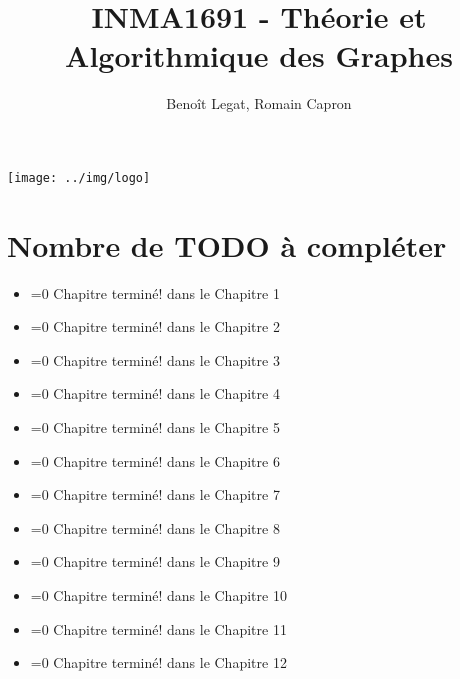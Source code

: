 

\title{INMA1691 - Théorie et Algorithmique des Graphes}
\author{Beno\^it Legat, Romain Capron}



\maketitle
\begin{center}
  \texttt{[image: ../img/logo]}
\end{center}
\newpage
\clearpage

\tableofcontents
\newpage


\newcommand{\addTODO}
{
  \textcolor{red}{TODO}\stepcounter{todo_\thesection}
}

\newcommand{\chapterdone}[2]
{
  \ifnum#1=0
    Chapitre terminé!
  \else
    #1 dans le Chapitre #2
  \fi
}














\clearpage
\section{Nombre de TODO à compléter \danger}
\begin{itemize}
  \item \chapterdone{}{1}
  \item \chapterdone{}{2}
  \item \chapterdone{}{3}
  \item \chapterdone{}{4}
  \item \chapterdone{}{5}
  \item \chapterdone{}{6}
  \item \chapterdone{}{7}
  \item \chapterdone{}{8}
  \item \chapterdone{}{9}
  \item \chapterdone{}{10}
  \item \chapterdone{}{11}
  \item \chapterdone{}{12}\\
\end{itemize}

